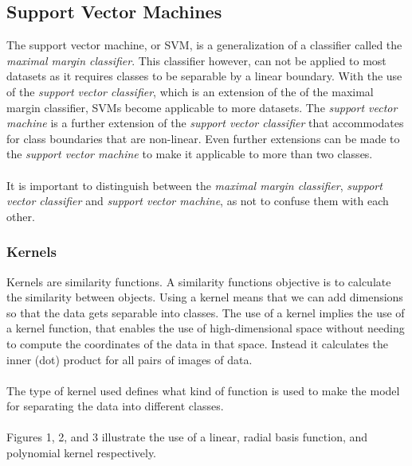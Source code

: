 \documentclass[11pt]{article}
\begin{document}
\subsection{Support Vector Machines}
The support vector machine, or SVM, is a generalization of a classifier called the \textit{maximal margin classifier}. This classifier however, can not be applied to most datasets as it requires classes to be separable by a linear boundary. With the use of the \textit{support vector classifier}, which is an extension of the of the maximal margin classifier, SVMs become applicable to more datasets. The \textit{support vector machine} is a further extension of the \textit{support vector classifier} that accommodates for class boundaries that are non-linear. Even further extensions can be made to the \textit{support vector machine} to make it applicable to more than two classes.\cite{jamesSupportVectorMachines}\\
\\
It is important to distinguish between the \textit{maximal margin classifier}, \textit{support vector classifier} and \textit{support vector machine}, as not to confuse them with each other.\cite{jamesSupportVectorMachines}

\subsubsection{Kernels}
Kernels are similarity functions. A similarity functions objective is to calculate the similarity between objects. Using a kernel means that we can add dimensions so that the data gets separable into classes. The use of a kernel implies the use of a kernel function, that enables the use of high-dimensional space without needing to compute the coordinates of the data in that space. Instead it calculates the inner (dot) product for all pairs of images of data.\cite{KernelMethod2021}\\
\\
The type of kernel used defines what kind of function is used to make the model for separating the data into different classes.\cite{SVMKernelsScikitlearn24}\\
\\
Figures 1, 2, and 3 illustrate the use of a linear, radial basis function, and polynomial kernel respectively.
\end{document}
